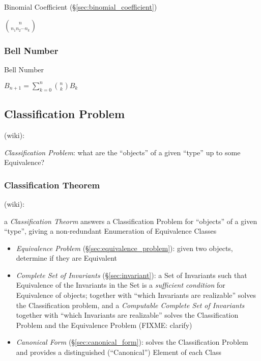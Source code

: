 Binomial Coefficient (\S\ref{sec:binomial_coefficient})

$\binom{n}{n_1 n_2 \cdots n_k}$



\subsubsection{Bell Number}\label{sec:bell_number}

Bell Number

$B_{n+1} = \sum_{k=0}^n \binom{n}{k} B_k$



\subsection{Classification Problem}\label{sec:classification_problem}

(wiki):

\emph{Classification Problem}: what are the ``objects'' of a given ``type'' up
to some Equivalence?



\subsubsection{Classification Theorem}\label{sec:classification_theorem}

(wiki):

a \emph{Classification Theorm} answers a Classification Problem for ``objects''
of a given ``type'', giving a non-redundant Enumeration of Equivalence Classes

\begin{itemize}
  \item \emph{Equivalence Problem} (\S\ref{sec:equivalence_problem}): given two
    objects, determine if they are Equivalent
  \item \emph{Complete Set of Invariants} (\S\ref{sec:invariant}): a Set of
    Invariants such that Equivalence of the Invariants in the Set is a
    \emph{sufficient condition} for Equivalence of objects; together with
    ``which Invariants are realizable'' solves the Classification problem, and a
    \emph{Computable Complete Set of Invariants} together with ``which
    Invariants are realizable'' solves the Classification Problem and the
    Equivalence Problem (FIXME: clarify)
  \item \emph{Canonical Form} (\S\ref{sec:canonical_form}): solves the
    Classification Problem and provides a distinguished (``Canonical'') Element
    of each Class
\end{itemize}

